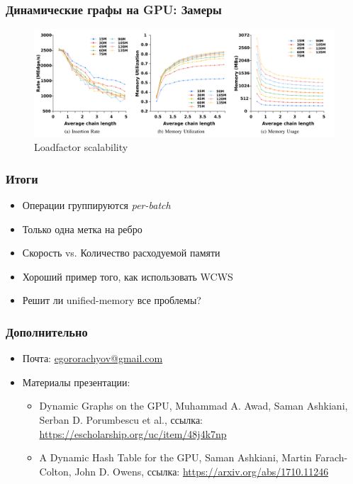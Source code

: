 \documentclass[xcolor=table,english]{beamer}
\begin{document}
\begin{frame}[fragile] \frametitle{Динамические графы на GPU: Замеры}
    \begin{minipage}[m]{0.95\linewidth}
        \begin{figure}
            \centering
            \includegraphics[width=\textwidth]{pictures/loadfactor.png}
            \caption{Loadfactor scalability}
            \label{fig:ld}
        \end{figure}
    \end{minipage}\hfill
\end{frame}

\begin{frame}[fragile] \frametitle{Итоги}
    \begin{itemize}
        \item Операции группируются \textit{per-batch}
        \item Только одна метка на ребро
        \item Скорость vs. Количество расходуемой памяти
        \item Хороший пример того, как использовать WCWS
        \item Решит ли unified-memory все проблемы?
    \end{itemize}
\end{frame}

\begin{frame} \frametitle{Дополнительно}
    \begin{itemize}
        \item Почта: \href{mailto:egororachyov@gmail.com}{egororachyov@gmail.com}
        \item Материалы презентации:
        {
            \begin{itemize}
                \item {Dynamic Graphs on the GPU, Muhammad A. Awad, 
              Saman Ashkiani, Serban D. Porumbescu et al., ссылка: 
              \href{https://escholarship.org/uc/item/48j4k7np}{https://escholarship.org/uc/item/48j4k7np}} 
                \item {A Dynamic Hash Table for the GPU, Saman Ashkiani, Martin Farach-Colton, John D. Owens, ссылка: \href{https://arxiv.org/abs/1710.11246}{https://arxiv.org/abs/1710.11246}}
            \end{itemize}
        }
    \end{itemize}
\end{frame}
\end{document}
